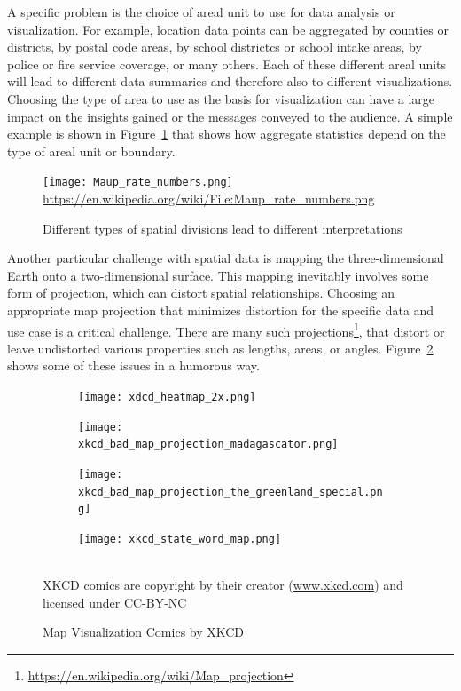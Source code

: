 A specific problem is the choice of areal unit to use for data analysis or visualization. For example, location data points can be aggregated by counties or districts, by postal code areas, by school districtcs or school intake areas, by police or fire service coverage, or many others. Each of these different areal units will lead to different data summaries and therefore also to different visualizations. Choosing the type of area to use as the basis for visualization can have a large impact on the insights gained or the messages conveyed to the audience. A simple example is shown in Figure~\ref{fig:maup} that shows how aggregate statistics depend on the type of areal unit or boundary.

\begin{figure}
\centering
\texttt{[image: Maup\_rate\_numbers.png]} \\

\small \url{https://en.wikipedia.org/wiki/File:Maup_rate_numbers.png}
\caption{Different types of spatial divisions lead to different interpretations} 
\label{fig:maup}
\end{figure}

Another particular challenge with spatial data is mapping the three-dimensional Earth onto a two-dimensional surface. This mapping inevitably involves some form of projection, which can distort spatial relationships. Choosing an appropriate map projection that minimizes distortion for the specific data and use case is a critical challenge. There are many such projections\footnote{\url{https://en.wikipedia.org/wiki/Map_projection}}, that distort or leave undistorted various properties such as lengths, areas, or angles. Figure~\ref{fig:xkcdmaps} shows some of these issues in a humorous way.

\begin{figure}
\centering
\begin{subfigure}{.49\textwidth}
\centering
  \texttt{[image: xdcd\_heatmap\_2x.png]}
\end{subfigure}
\hfill
\begin{subfigure}{.49\textwidth}
\centering
  \texttt{[image: xkcd\_bad\_map\_projection\_madagascator.png]}
\end{subfigure}
\hfill
\begin{subfigure}{.49\textwidth}
\centering
  \texttt{[image: xkcd\_bad\_map\_projection\_the\_greenland\_special.png]}
\end{subfigure}
\hfill
\begin{subfigure}{.49\textwidth}
\centering
  \texttt{[image: xkcd\_state\_word\_map.png]}
\end{subfigure} \\ 
\tiny \scriptsize{XKCD comics are copyright by their creator (\url{www.xkcd.com}) and licensed under CC-BY-NC}

\caption{Map Visualization Comics by XKCD}
\label{fig:xkcdmaps}
\end{figure}

